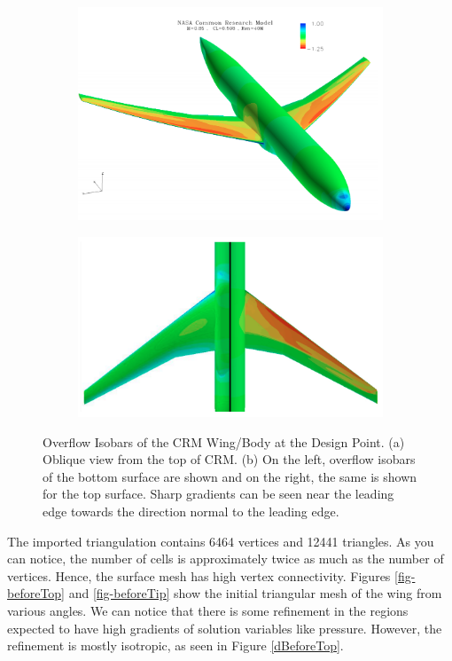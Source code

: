 \begin{figure}[!hbt]
	\centering
	\begin{subfigure}{0.5\textwidth}
		\centering
		\includegraphics[width=0.9\linewidth]{img/r/dpw4/overflowIsobar.png}
		\caption{}
		\label{overflowIsobar}
	\end{subfigure}%
	\begin{subfigure}{0.5\textwidth}
		\centering
		\includegraphics[width = 0.9\linewidth]{img/r/dpw4/overflowIsobar2.png}
		\caption{}
		\label{overflowIso}
	\end{subfigure}%
	\caption[Overflow Isobars of the CRM Wing/Body at the Design Point.]{Overflow Isobars of the CRM Wing/Body at the Design Point. (a) Oblique view from the top of CRM. (b) On the left, overflow isobars of the bottom surface are shown and on the right, the same is shown for the top surface. Sharp gradients can be seen near the leading edge towards the direction normal to the leading edge.}
	\label{fig-overflowIsobar}
\end{figure}


The imported triangulation contains 6464 vertices and 12441 triangles. As you can notice, the number of cells is approximately twice as much as the number of vertices. Hence, the surface mesh has high vertex connectivity. Figures \ref{fig-beforeTop} and \ref{fig-beforeTip} show the initial triangular mesh of the wing from various angles. We can notice that there is some refinement in the regions expected to have high gradients of solution variables like pressure. However, the refinement is mostly isotropic, as seen in Figure \ref{dBeforeTop}.

